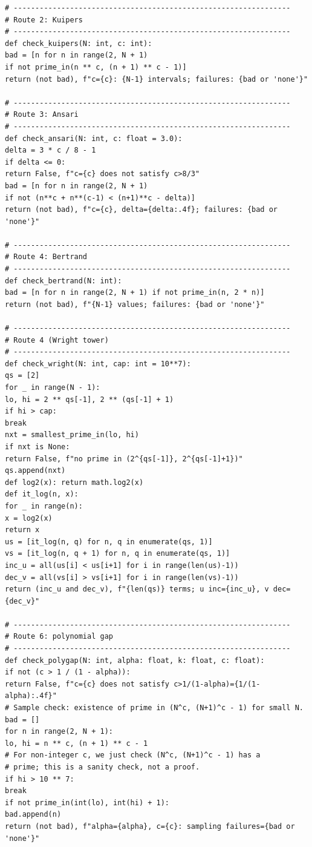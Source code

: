 \documentclass[11pt,reqno]{amsart}
\theoremstyle{blueplain}
\numberwithin{equation}{section}
\begin{document}
\begin{lstlisting}[style=python]
# ----------------------------------------------------------------
# Route 2: Kuipers
# ----------------------------------------------------------------
def check_kuipers(N: int, c: int):
bad = [n for n in range(2, N + 1)
if not prime_in(n ** c, (n + 1) ** c - 1)]
return (not bad), f"c={c}: {N-1} intervals; failures: {bad or 'none'}"

# ----------------------------------------------------------------
# Route 3: Ansari
# ----------------------------------------------------------------
def check_ansari(N: int, c: float = 3.0):
delta = 3 * c / 8 - 1
if delta <= 0:
return False, f"c={c} does not satisfy c>8/3"
bad = [n for n in range(2, N + 1)
if not (n**c + n**(c-1) < (n+1)**c - delta)]
return (not bad), f"c={c}, delta={delta:.4f}; failures: {bad or 'none'}"

# ----------------------------------------------------------------
# Route 4: Bertrand
# ----------------------------------------------------------------
def check_bertrand(N: int):
bad = [n for n in range(2, N + 1) if not prime_in(n, 2 * n)]
return (not bad), f"{N-1} values; failures: {bad or 'none'}"

# ----------------------------------------------------------------
# Route 4 (Wright tower)
# ----------------------------------------------------------------
def check_wright(N: int, cap: int = 10**7):
qs = [2]
for _ in range(N - 1):
lo, hi = 2 ** qs[-1], 2 ** (qs[-1] + 1)
if hi > cap:
break
nxt = smallest_prime_in(lo, hi)
if nxt is None:
return False, f"no prime in (2^{qs[-1]}, 2^{qs[-1]+1})"
qs.append(nxt)
def log2(x): return math.log2(x)
def it_log(n, x):
for _ in range(n):
x = log2(x)
return x
us = [it_log(n, q) for n, q in enumerate(qs, 1)]
vs = [it_log(n, q + 1) for n, q in enumerate(qs, 1)]
inc_u = all(us[i] < us[i+1] for i in range(len(us)-1))
dec_v = all(vs[i] > vs[i+1] for i in range(len(vs)-1))
return (inc_u and dec_v), f"{len(qs)} terms; u inc={inc_u}, v dec={dec_v}"

# ----------------------------------------------------------------
# Route 6: polynomial gap
# ----------------------------------------------------------------
def check_polygap(N: int, alpha: float, k: float, c: float):
if not (c > 1 / (1 - alpha)):
return False, f"c={c} does not satisfy c>1/(1-alpha)={1/(1-alpha):.4f}"
# Sample check: existence of prime in (N^c, (N+1)^c - 1) for small N.
bad = []
for n in range(2, N + 1):
lo, hi = n ** c, (n + 1) ** c - 1
# For non-integer c, we just check (N^c, (N+1)^c - 1) has a
# prime; this is a sanity check, not a proof.
if hi > 10 ** 7:
break
if not prime_in(int(lo), int(hi) + 1):
bad.append(n)
return (not bad), f"alpha={alpha}, c={c}: sampling failures={bad or 'none'}"


\end{lstlisting}
\end{document}
